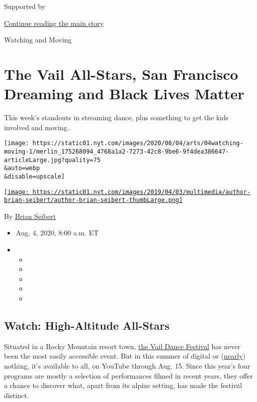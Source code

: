 Supported by

\protect\hyperlink{after-sponsor}{Continue reading the main story}

Watching and Moving

\hypertarget{the-vail-all-stars-san-francisco-dreaming-and-black-lives-matter}{%
\section{The Vail All-Stars, San Francisco Dreaming and Black Lives
Matter}\label{the-vail-all-stars-san-francisco-dreaming-and-black-lives-matter}}

This week's standouts in streaming dance, plus something to get the kids
involved and moving.

\texttt{[image: https://static01.nyt.com/images/2020/08/04/arts/04watching-moving-1/merlin\_175268094\_4768a1a2-7273-42c8-9be6-9f4dea386647-articleLarge.jpg?quality=75\\\&auto=webp\\\&disable=upscale]}

\href{https://www.nytimes.com/by/brian-seibert}{\texttt{[image: https://static01.nyt.com/images/2019/04/03/multimedia/author-brian-seibert/author-brian-seibert-thumbLarge.png]}}

By \href{https://www.nytimes.com/by/brian-seibert}{Brian Seibert}

\begin{itemize}
\item
  Aug. 4, 2020, 8:00 a.m. ET
\item
  \begin{itemize}
  \item
  \item
  \item
  \item
  \item
  \end{itemize}
\end{itemize}

\hypertarget{watch-high-altitude-all-stars}{%
\subsection{Watch: High-Altitude
All-Stars}\label{watch-high-altitude-all-stars}}

Situated in a Rocky Mountain resort town,
\href{https://vaildance.org/}{the Vail Dance Festival} has never been
the most easily accessible event. But in this summer of digital or
(\href{https://www.nytimes.com/2020/07/29/arts/dance/kaatsbaan-dance-festival-stella-abrera.html}{nearly})
nothing, it's available to all, on YouTube through Aug. 15. Since this
year's four programs are mostly a selection of performances filmed in
recent years, they offer a chance to discover what, apart from its
alpine setting, has made the festival distinct.

